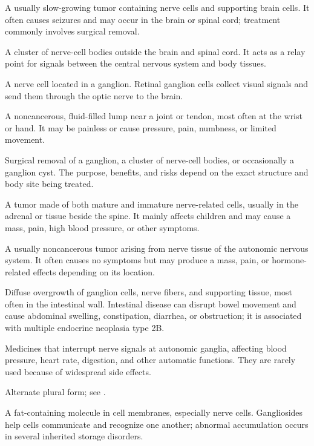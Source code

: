  A usually slow-growing tumor containing nerve cells and supporting brain cells. It often causes seizures and may occur in the brain or spinal cord; treatment commonly involves surgical removal.

 A cluster of nerve-cell bodies outside the brain and spinal cord. It acts as a relay point for signals between the central nervous system and body tissues.

 A nerve cell located in a ganglion. Retinal ganglion cells collect visual signals and send them through the optic nerve to the brain.

 A noncancerous, fluid-filled lump near a joint or tendon, most often at the wrist or hand. It may be painless or cause pressure, pain, numbness, or limited movement.

 Surgical removal of a ganglion, a cluster of nerve-cell bodies, or occasionally a ganglion cyst. The purpose, benefits, and risks depend on the exact structure and body site being treated.

 A tumor made of both mature and immature nerve-related cells, usually in the adrenal or tissue beside the spine. It mainly affects children and may cause a mass, pain, high blood pressure, or other symptoms.

 A usually noncancerous tumor arising from nerve tissue of the autonomic nervous system. It often causes no symptoms but may produce a mass, pain, or hormone-related effects depending on its location.

 Diffuse overgrowth of ganglion cells, nerve fibers, and supporting tissue, most often in the intestinal wall. Intestinal disease can disrupt bowel movement and cause abdominal swelling, constipation, diarrhea, or obstruction; it is associated with multiple endocrine neoplasia type 2B.

 Medicines that interrupt nerve signals at autonomic ganglia, affecting blood pressure, heart rate, digestion, and other automatic functions. They are rarely used because of widespread side effects.

 Alternate plural form; see .

 A fat-containing molecule in cell membranes, especially nerve cells. Gangliosides help cells communicate and recognize one another; abnormal accumulation occurs in several inherited storage disorders.

